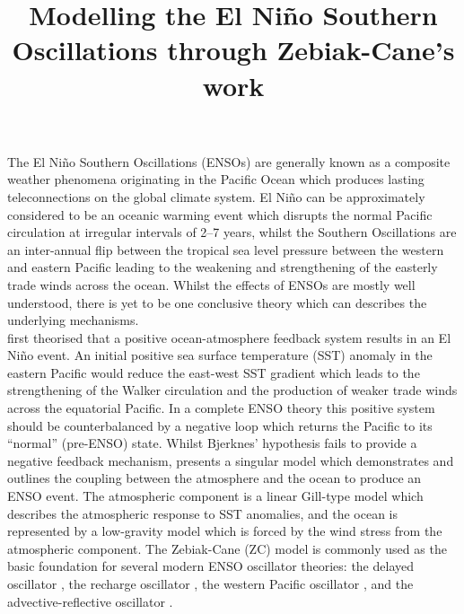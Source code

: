 \documentclass[12pt, onecolumn]{revtex4}    %
\begin{document}
                     

\title{Modelling the El Ni\~{n}o Southern Oscillations through Zebiak-Cane's work} 

\maketitle
\thispagestyle{plain} %

The El Ni\~{n}o Southern Oscillations (ENSOs) are generally known as a composite weather phenomena originating in the Pacific Ocean which produces lasting teleconnections on the global climate system. El Ni\~{n}o can be approximately considered to be an oceanic warming event which disrupts the normal Pacific circulation at irregular intervals of 2--7 years, whilst the Southern Oscillations are an inter-annual flip between the tropical sea level pressure between the western and eastern Pacific leading to the weakening and strengthening of the easterly trade winds across the ocean. Whilst the effects of ENSOs are mostly well understood, there is yet to be one conclusive theory which can describes the underlying mechanisms. \\

\cite{doi:10.1175/1520-04931969097} first theorised that a positive ocean-atmosphere feedback system results in an El Ni\~{n}o event. An initial positive sea surface temperature (SST) anomaly in the eastern Pacific would reduce the east-west SST gradient which leads to the strengthening of the Walker circulation and the production of weaker trade winds across the equatorial Pacific. In a complete ENSO theory this positive system should be counterbalanced by a negative loop which returns the Pacific to its ``normal'' (pre-ENSO) state. Whilst Bjerknes' hypothesis fails to provide a negative feedback mechanism, \cite{Zebiak:1987aa} presents a singular model which demonstrates and outlines the coupling between the atmosphere and the ocean to produce an ENSO event. The atmospheric component is a linear Gill-type model \citep{Gill:1980aa} which describes the atmospheric response to SST anomalies, and the ocean is represented by a low-gravity model which is forced by the wind stress from the atmospheric component. The Zebiak-Cane (ZC) model is commonly used as the basic foundation for several modern ENSO oscillator theories: the delayed oscillator \citep{Suarez:1988aa, Battisti:1988aa}, the recharge oscillator \citep{Jin:1997aa}, the western Pacific oscillator \citep{Weisberg:1997aa, wang1999effects}, and the advective-reflective oscillator \citep{Picaut663}. \\
\end{document}
